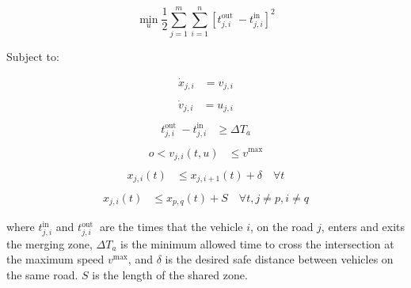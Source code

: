 \begin{equation}
\min_{u} \frac{1}{2} \sum_{j=1}^{m} \sum_{i=1}^{n}\left[t_{j, i}^{\text {out }}-t_{j, i}^{\text {in }}\right]^{2}
\end{equation}

Subject to: 

\begin{equation}
    \begin{aligned}
\dot{x}_{j, i} &=v_{j, i} \\
\end{aligned}
\end{equation}
\begin{equation}
\begin{aligned}
\dot{v}_{j, i} &=u_{j, i} \\
\end{aligned}
\end{equation}
\begin{equation}
\begin{aligned}
t_{j, i}^{\text {out }}-t_{j, i}^{\text {in }} & \geq \Delta T_{a} \\
\end{aligned}
\end{equation}
\begin{equation}
\begin{aligned}
o<v_{j, i}(t, u) & \leq v^{\max } \\
\end{aligned}
\end{equation}
\begin{equation}
\begin{aligned}
x_{j, i}(t) & \leq x_{j, i+1}(t)+\delta \quad \forall t \\
\end{aligned}
\end{equation}
\begin{equation}
\begin{aligned}
x_{j, i}(t) & \leq x_{p, q}(t)+S \quad \forall t, j \neq p, i \neq q
\end{aligned}
\end{equation}


\noindent where $t_{j, i}^{\text {in }}$ and $t_{j, i}^{\text {out }}$ are the times that the vehicle $i$, on the road $j$, enters and exits the merging zone, $\Delta T_{a}$ is the minimum allowed time to cross the intersection at the maximum speed $v^{\max}$, and $\delta$ is the desired safe distance between vehicles on the same road. $S$ is the length of the shared zone.

